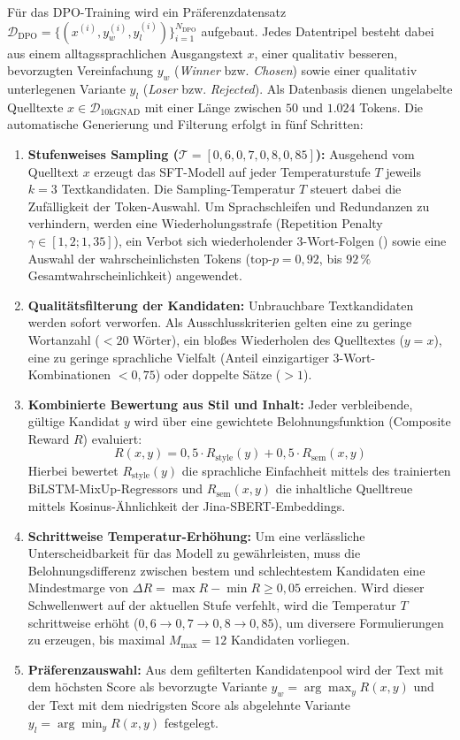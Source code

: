 Für das DPO-Training wird ein Präferenzdatensatz $\mathcal{D}_{\text{DPO}} = \{ (x^{(i)}, y_w^{(i)}, y_l^{(i)}) \}_{i=1}^{N_{\text{DPO}}}$ aufgebaut. Jedes Datentripel besteht dabei aus einem alltagssprachlichen Ausgangstext $x$, einer qualitativ besseren, bevorzugten Vereinfachung $y_w$ (\textit{Winner} bzw. \textit{Chosen}) sowie einer qualitativ unterlegenen Variante $y_l$ (\textit{Loser} bzw. \textit{Rejected}). Als Datenbasis dienen ungelabelte Quelltexte $x \in \mathcal{D}_{\text{10kGNAD}}$ mit einer Länge zwischen $50$ und $1.024$ Tokens. Die automatische Generierung und Filterung erfolgt in fünf Schritten:

\begin{enumerate}
    \item \textbf{Stufenweises Sampling ($\mathcal{T} = [0{,}6, 0{,}7, 0{,}8, 0{,}85]$):} Ausgehend vom Quelltext $x$ erzeugt das SFT-Modell auf jeder Temperaturstufe $T$ jeweils $k = 3$ Textkandidaten. Die Sampling-Temperatur $T$ steuert dabei die Zufälligkeit der Token-Auswahl. Um Sprachschleifen und Redundanzen zu verhindern, werden eine Wiederholungsstrafe (Repetition Penalty $\gamma \in [1{,}2; 1{,}35]$), ein Verbot sich wiederholender 3-Wort-Folgen () sowie eine Auswahl der wahrscheinlichsten Tokens ($\text{top-}p = 0{,}92$, bis $92\,\%$ Gesamtwahrscheinlichkeit) angewendet.
    \item \textbf{Qualitätsfilterung der Kandidaten:} Unbrauchbare Textkandidaten werden sofort verworfen. Als Ausschlusskriterien gelten eine zu geringe Wortanzahl ($< 20$ Wörter), ein bloßes Wiederholen des Quelltextes ($y = x$), eine zu geringe sprachliche Vielfalt (Anteil einzigartiger 3-Wort-Kombinationen $< 0{,}75$) oder doppelte Sätze ($> 1$).
    \item \textbf{Kombinierte Bewertung aus Stil und Inhalt:} Jeder verbleibende, gültige Kandidat $y$ wird über eine gewichtete Belohnungsfunktion (Composite Reward $R$) evaluiert:
    \begin{equation}
        R(x, y) = 0{,}5 \cdot R_{\text{style}}(y) + 0{,}5 \cdot R_{\text{sem}}(x, y)
    \end{equation}
    Hierbei bewertet $R_{\text{style}}(y)$ die sprachliche Einfachheit mittels des trainierten BiLSTM-MixUp-Regressors und $R_{\text{sem}}(x, y)$ die inhaltliche Quelltreue mittels Kosinus-Ähnlichkeit der Jina-SBERT-Embeddings.
    \item \textbf{Schrittweise Temperatur-Erhöhung:} Um eine verlässliche Unterscheidbarkeit für das Modell zu gewährleisten, muss die Belohnungsdifferenz zwischen bestem und schlechtestem Kandidaten eine Mindestmarge von $\Delta R = \max R - \min R \ge 0{,}05$ erreichen. Wird dieser Schwellenwert auf der aktuellen Stufe verfehlt, wird die Temperatur $T$ schrittweise erhöht ($0{,}6 \to 0{,}7 \to 0{,}8 \to 0{,}85$), um diversere Formulierungen zu erzeugen, bis maximal $M_{\max} = 12$ Kandidaten vorliegen.
    \item \textbf{Präferenzauswahl:} Aus dem gefilterten Kandidatenpool wird der Text mit dem höchsten Score als bevorzugte Variante $y_w = \arg\max_y R(x, y)$ und der Text mit dem niedrigsten Score als abgelehnte Variante $y_l = \arg\min_y R(x, y)$ festgelegt.
\end{enumerate}

